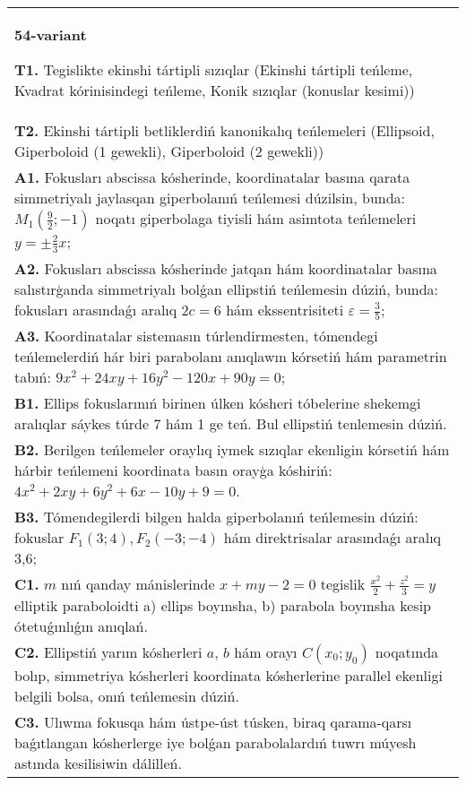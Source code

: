 \documentclass{article}
\begin{document}
\begin{tabular}{m{17cm}}
\textbf{54-variant}
\newline

\textbf{T1.} Tegislikte ekinshi tártipli sızıqlar (Ekinshi tártipli teńleme, Kvadrat kórinisindegi teńleme, Konik sızıqlar (konuslar kesimi)) \\
\textbf{T2.} Ekinshi tártipli betliklerdiń kanonikalıq teńlemeleri (Ellipsoid, Giperboloid (1 gewekli), Giperboloid (2 gewekli)) \\
\textbf{A1.} Fokusları abscissa kósherinde, koordinatalar basına qarata simmetriyalı jaylasqan giperbolanıń teńlemesi dúzilsin, bunda: $M_1\left(\frac{9}{2};-1\right) $ noqatı giperbolaga tiyisli hám asimtota teńlemeleri $y= \pm \frac{2}{3} x$; \\
\textbf{A2.} Fokusları abscissa kósherinde jatqan hám koordinatalar basına salıstırģanda simmetriyalı bolǵan ellipstiń teńlemesin dúziń, bunda: fokusları arasındaǵı aralıq $2 c=6$ hám ekssentrisiteti $\varepsilon=\frac{3}{5}$; \\
\textbf{A3.} Koordinatalar sistemasın túrlendirmesten, tómendegi teńlemelerdiń hár biri parabolanı anıqlawın kórsetiń hám parametrin tabıń: $9 x^2+24 x y+16 y^2-120 x+90 y=0$; \\
\textbf{B1.} Ellips fokuslarınıń birinen úlken kósheri tóbelerine shekemgi aralıqlar sáykes túrde 7 hám 1 ge teń. Bul ellipstiń tenlemesin dúziń. \\
\textbf{B2.} Berilgen teńlemeler oraylıq iymek sızıqlar ekenligin kórsetiń hám hárbir teńlemeni koordinata basın orayģa kóshiriń:  $4 x^2+2 x y+6 y^2+6 x-10 y+9=0$. \\
\textbf{B3.} Tómendegilerdi bilgen halda giperbolanıń teńlemesin dúziń: fokuslar $F_1 (3; 4), F_2 (-3;-4) $ hám direktrisalar arasındaǵı aralıq 3,6; \\
\textbf{C1.} $m$ nıń qanday mánislerinde $x+m y-2=0$ tegislik $\frac{x^2}{2}+\frac{z^2}{3}=y$ elliptik paraboloidti a) ellips boyınsha, b) parabola boyınsha kesip ótetuǵınlıǵın anıqlań. \\
\textbf{C2.} Ellipstiń yarım kósherleri $a$, $b$ hám orayı $C\left(x_0; y_0\right) $ noqatında bolıp, simmetriya kósherleri koordinata kósherlerine parallel ekenligi belgili bolsa, onıń teńlemesin dúziń. \\
\textbf{C3.} Ulıwma fokusqa hám ústpe-úst túsken, biraq qarama-qarsı baǵıtlangan kósherlerge iye bolǵan parabolalardıń tuwrı múyesh astında kesilisiwin dálilleń. \\

\end{tabular}
\vspace{1cm}
\end{document}
